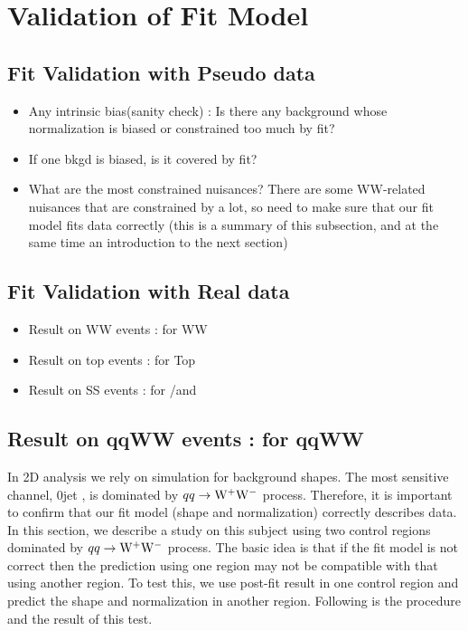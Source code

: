 
\section{Validation of Fit Model} 
\subsection{Fit Validation with Pseudo data} 
\begin{itemize} 
\item Any intrinsic bias(sanity check) : Is there any background 
      whose normalization is biased or constrained too much by fit?
\item If one bkgd is biased, is it covered by fit? 
\item What are the most constrained nuisances?  There are some WW-related nuisances   
that are constrained by a lot, so need to make sure that our fit model fits data correctly 
(this is a summary of this subsection, and at the same time an introduction to the next section)
\end{itemize} 

\subsection{Fit Validation with Real data}
\begin{itemize} 
\item Result on WW events : for WW 
\item Result on top events : for Top 
\item Result on SS events : for \wgamma/\wgammastar and \wjets
\end{itemize} 

\subsection{Result on qqWW events : for qqWW}  

In 2D analysis we rely on simulation for background shapes. 
The most sensitive channel, 0jet \DF, is dominated by $qq\rightarrow\mathrm{W}^+\mathrm{W}^-$ process. 
Therefore, it is important to confirm that our fit model (shape and normalization) 
correctly describes data. In this section, we describe a study on this subject using two 
control regions dominated by $qq\rightarrow\mathrm{W}^+\mathrm{W}^-$ process.
The basic idea is that if the fit model is not correct then the prediction using 
one region may not be compatible with that using another region. To test this, 
we use post-fit result in one control region and predict the shape and normalization 
in another region. Following is the procedure and the result of this test. 

